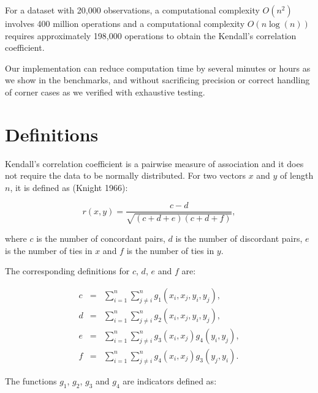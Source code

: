 \documentclass[12pt]{article}
\begin{document}
For a dataset with 20,000 observations, a computational complexity
\(O(n^2)\) involves 400 million operations and a computational
complexity \(O(n \log(n))\) requires approximately 198,000 operations to
obtain the Kendall's correlation coefficient.

Our implementation can reduce computation time by several minutes or
hours as we show in the benchmarks, and without sacrificing precision or
correct handling of corner cases as we verified with exhaustive testing.

\section{Definitions}\label{definitions}

Kendall's correlation coefficient is a pairwise measure of association
and it does not require the data to be normally distributed. For two
vectors \(x\) and \(y\) of length \(n\), it is defined as (Knight 1966):

\begin{equation*}
r(x,y) = \frac{c - d}{\sqrt{(c + d + e)(c + d + f)}},
\end{equation*}

where \(c\) is the number of concordant pairs, \(d\) is the number of
discordant pairs, \(e\) is the number of ties in \(x\) and \(f\) is the
number of ties in \(y\).

The corresponding definitions for \(c\), \(d\), \(e\) and \(f\) are:

\begin{eqnarray*}
c &=& \sum_{i=1}^{n} \sum_{j \neq i}^{n} g_1(x_i, x_j, y_i, y_j), \\
d &=& \sum_{i=1}^{n} \sum_{j \neq i}^{n} g_2(x_i, x_j, y_i, y_j), \\ 
e &=& \sum_{i=1}^{n} \sum_{j \neq i}^{n} g_3(x_i, x_j) g_4(y_i, y_j), \\
f &=& \sum_{i=1}^{n} \sum_{j \neq i}^{n} g_4(x_i, x_j) g_3(y_j, y_i).
\end{eqnarray*}

The functions \(g_1\), \(g_2\), \(g_3\) and \(g_4\) are indicators
defined as:
\end{document}
